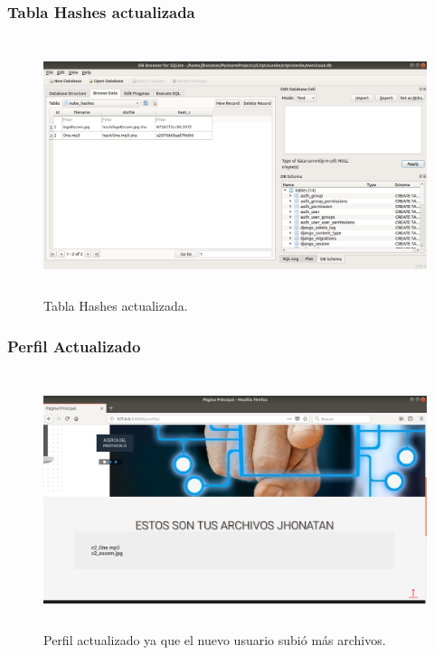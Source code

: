 \subsubsection{Tabla Hashes actualizada}

			\begin{figure}[H]
			\centering
			\includegraphics[width=14cm, height=7.5cm]{./images/Implementacion/TablaHashesOtroUsuario.png}
			\caption{Tabla Hashes actualizada.}
			\label{fig:6-1-23} 
			\end{figure}

\subsubsection{Perfil Actualizado}

			\begin{figure}[H]
			\centering
			\includegraphics[width=14cm, height=7.5cm]{./images/Implementacion/PerfilOtroUsuarioActualizado.png}
			\caption{Perfil actualizado ya que el nuevo usuario subió más archivos.}
			\label{fig:6-1-24} 
			\end{figure}

